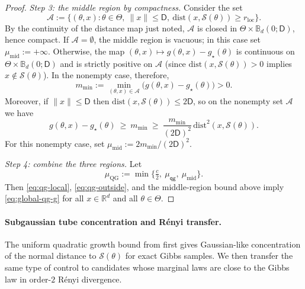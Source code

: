 \documentclass{article}
\theoremstyle{normaltheorem}
\newcommand{\R}{\mathbb{R}}
\newcommand{\calS}{\mathcal{S}}
\begin{document}
\begin{proof}
\emph{Step 3: the middle region by compactness.}
Consider the set
\[
\mathcal A
:=\Big\{(\theta,x):\theta\in\Theta,\ \|x\|\le \mathsf D,\ \mathrm{dist}(x,\calS(\theta))\ge r_{\mathrm{loc}}\Big\}.
\]
By the continuity of the distance map just noted, \(\mathcal A\) is closed in
\(\Theta\times \mathbb B_d(0;\mathsf D)\), hence compact. If \(\mathcal A=\emptyset\), the middle region is vacuous; in this
case set \(\mu_{\mathrm{mid}}:=+\infty\). Otherwise, the map
$(\theta,x)\mapsto g(\theta,x)-g_\star(\theta)$ is continuous on $\Theta\times \mathbb B_d(0;\mathsf D)$ and is strictly
positive on $\mathcal A$ (since $\mathrm{dist}(x,\calS(\theta))>0$ implies $x\notin\calS(\theta)$).
In the nonempty case, therefore,
\[
m_{\min}:=\min_{(\theta,x)\in\mathcal A}\big(g(\theta,x)-g_\star(\theta)\big)>0.
\]
Moreover, if $\|x\|\le \mathsf D$ then $\mathrm{dist}(x,\calS(\theta))\le 2\mathsf D$, so on the nonempty set
\(\mathcal A\) we have
\[
g(\theta,x)-g_\star(\theta)\ \ge\ m_{\min}
\ \ge\ \frac{m_{\min}}{(2\mathsf D)^2}\,\mathrm{dist}^2(x,\calS(\theta)).
\]
For this nonempty case, set \(\mu_{\mathrm{mid}}:=2m_{\min}/(2\mathsf D)^2\).

\emph{Step 4: combine the three regions.}
Let
\[
\mu_{\mathrm{QG}}
:=\min\Big\{\tfrac{c}{2},\ \mu_{\mathsf{qg}},\ \mu_{\mathrm{mid}}\Big\}.
\]
Then \eqref{eq:qg-local}, \eqref{eq:qg-outside}, and the middle-region bound above imply \eqref{eq:global-qg-g} for all $x\in\R^d$ and all
$\theta\in\Theta$.
\end{proof}

\paragraph{Subgaussian tube concentration and R\'enyi transfer.}
The uniform quadratic growth bound from  first gives Gaussian-like concentration of the normal
distance to $\calS(\theta)$ for exact Gibbs samples. We then transfer the same type of control to candidates whose
marginal laws are close to the Gibbs law in order-$2$ R\'enyi divergence.
\end{document}
